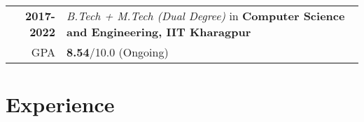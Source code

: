 \documentclass[a4paper,10pt]{extarticle} %
\begin{document}
\begin{tabular}{r|p{17.5cm}}	
\textbf{2017-2022} & \textit{B.Tech + M.Tech (Dual Degree)} in \textbf{Computer Science and Engineering, IIT Kharagpur}\\
\hfill GPA & \textbf{8.54}/10.0 (Ongoing)\\
\end{tabular}

\vspace{-0.3cm}
\section{\textcolor{primary}{Experience}}
\end{document}
